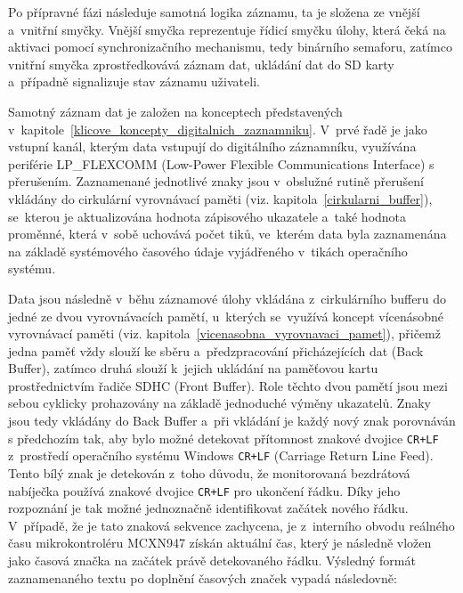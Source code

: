 Po přípravné fázi následuje samotná logika záznamu, ta je složena ze vnější a~vnitřní smyčky. Vnější smyčka reprezentuje řídicí smyčku úlohy, která čeká na aktivaci pomocí synchronizačního mechanismu, tedy binárního semaforu, zatímco vnitřní smyčka zprostředkovává záznam dat, ukládání dat do SD karty a~případně signalizuje stav záznamu uživateli.

Samotný záznam dat je založen na konceptech představených v~kapitole~\ref{klicove_koncepty_digitalnich_zaznamniku}. V~prvé řadě je jako vstupní kanál, kterým data vstupují do digitálního záznamníku, využívána periférie LP\_FLEXCOMM (Low-Power Flexible Communications Interface) s přerušením. Zaznamenané jednotlivé znaky jsou v~obslužné rutině přerušení vkládány do cirkulární vyrovnávací paměti (viz. kapitola~\ref{cirkularni_buffer}), se~kterou je aktualizována hodnota zápisového ukazatele a~také hodnota proměnné, která v~sobě uchovává počet tiků, ve~kterém data byla zaznamenána na základě systémového časového údaje vyjádřeného v~tikách operačního systému.

\newpage

Data jsou následně v~běhu záznamové úlohy vkládána z~cirkulárního bufferu do jedné ze dvou vyrovnávacích pamětí, u~kterých se~využívá koncept vícenásobné vyrovnávací paměti (viz. kapitola~\ref{vicenasobna_vyrovnavaci_pamet}), přičemž jedna paměť vždy slouží ke sběru a~předzpracování přicházejících dat (Back Buffer), zatímco druhá slouží k~jejich ukládání na paměťovou kartu prostřednictvím řadiče SDHC (Front Buffer). Role těchto dvou pamětí jsou mezi sebou cyklicky prohazovány na základě jednoduché výměny ukazatelů. Znaky jsou tedy vkládány do Back Buffer a~při vkládání je každý nový znak porovnáván s předchozím tak, aby bylo možné detekovat přítomnost znakové dvojice \texttt{CR+LF} z~prostředí operačního systému Windows \texttt{CR+LF} (Carriage Return Line Feed). Tento bílý znak je detekován z~toho důvodu, že monitorovaná bezdrátová nabíječka používá znakové dvojice \texttt{CR+LF} pro ukončení řádku. Díky jeho rozpoznání je tak možné jednoznačně identifikovat začátek nového řádku. V~případě, že je tato znaková sekvence zachycena, je z~interního obvodu reálného času mikrokontroléru MCXN947 získán aktuální čas, který je následně vložen jako časová značka na začátek právě detekovaného řádku. Výsledný formát zaznamenaného textu po doplnění časových značek vypadá následovně:

